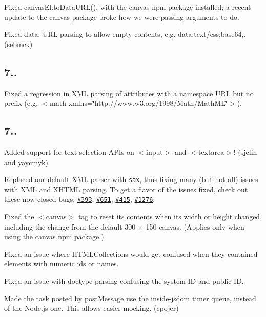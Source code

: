 
\begin{DoxyItemize}
\item Fixed {\ttfamily canvas\+El.\+to\+Data\+U\+R\+L()}, with the {\ttfamily canvas} npm package installed; a recent update to the {\ttfamily canvas} package broke how we were passing arguments to do.
\item Fixed {\ttfamily data\+:} U\+RL parsing to allow empty contents, e.\+g. {\ttfamily data\+:text/css;base64,}. (sebmck)
\end{DoxyItemize}

\subsection*{7..}


\begin{DoxyItemize}
\item Fixed a regression in X\+ML parsing of attributes with a namespace U\+RL but no prefix (e.\+g. {\ttfamily $<$math xmlns=\char`\"{}http\+://www.\+w3.\+org/1998/\+Math/\+Math\+M\+L\char`\"{}$>$}).
\end{DoxyItemize}

\subsection*{7..}


\begin{DoxyItemize}
\item Added support for text selection A\+P\+Is on {\ttfamily $<$input$>$} and {\ttfamily $<$textarea$>$}! (sjelin and yaycmyk)
\item Replaced our default X\+ML parser with \href{https://www.npmjs.com/package/sax}{\tt sax}, thus fixing many (but not all) issues with X\+ML and X\+H\+T\+ML parsing. To get a flavor of the issues fixed, check out these now-\/closed bugs\+: \href{https://github.com/tmpvar/jsdom/issues/393}{\tt \#393}, \href{https://github.com/tmpvar/jsdom/issues/651}{\tt \#651}, \href{https://github.com/tmpvar/jsdom/issues/415}{\tt \#415}, \href{https://github.com/tmpvar/jsdom/issues/1276}{\tt \#1276}.
\item Fixed the {\ttfamily $<$canvas$>$} tag to reset its contents when its width or height changed, including the change from the default 300 × 150 canvas. (Applies only when using the {\ttfamily canvas} npm package.)
\item Fixed an issue where {\ttfamily H\+T\+M\+L\+Collection}s would get confused when they contained elements with numeric {\ttfamily id}s or {\ttfamily name}s.
\item Fixed an issue with doctype parsing confusing the system ID and public ID.
\item Made the task posted by {\ttfamily post\+Message} use the inside-\/jsdom timer queue, instead of the Node.\+js one. This allows easier mocking. (cpojer)
\end{DoxyItemize}

